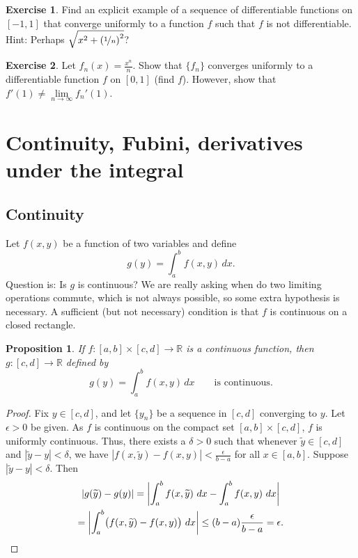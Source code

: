 \documentclass[12pt,openany]{book}
\newcommand{\bbabs}[1]{\biggl\lvert {#1} \biggr\rvert}
\newcommand{\abs}[1]{\left\lvert {#1} \right\rvert}
\newcommand{\R}{{\mathbb{R}}}
\theoremstyle{plain}
\newtheorem{prop}[thm]{Proposition}
\theoremstyle{remark}
\theoremstyle{definition}
\newenvironment{exbox}{%
    \def\FrameCommand{\vrule width 1pt \relax\hspace{10pt}}%
    \MakeFramed{\advance\hsize-\width\FrameRestore}%
}{%
    \endMakeFramed
}
\theoremstyle{exercise}
\newtheorem{exercise}{Exercise}[section]
\theoremstyle{example}
\begin{document}
\begin{exbox}
\begin{exercise}
Find an explicit example of a sequence of
differentiable functions on $[-1,1]$ that converge uniformly to
a function $f$ such that $f$ is not differentiable.
Hint:
Perhaps $\sqrt{x^2+{(\nicefrac{1}{n})}^2}$?
\end{exercise}

\begin{exercise}
Let $f_n(x) = \frac{x^n}{n}$.  Show that $\{ f_n \}$ converges uniformly to
a differentiable function $f$ on $[0,1]$ (find $f$).  However, show that
$f'(1) \not= \lim\limits_{n\to\infty} f_n'(1)$.
\end{exercise}
\end{exbox}


\section{Continuity, Fubini, derivatives under the integral}
\label{sec:contlimitsunderint}

\subsection{Continuity}

Let $f(x,y)$ be a function of two variables and define
\begin{equation*}
g(y) = \int_a^b f(x,y) \,dx .
\end{equation*}
Question is: Is $g$ is continuous?
We are really asking when do two limiting operations commute,
which is not always possible, so some extra hypothesis
is necessary.  A sufficient (but not
necessary) condition is that $f$ is continuous on a closed rectangle.

\begin{prop} \label{prop:integralcontcont}
If $f \colon [a,b] \times [c,d] \to \R$ is a continuous function,
then $g \colon [c,d] \to \R$ defined by
\begin{equation*}
g(y) = \int_a^b f(x,y) \,dx  \qquad \text{is continuous}.
\end{equation*}
\end{prop}

\begin{proof}
Fix $y \in [c,d]$, and let $\{ y_n \}$ be a sequence in $[c,d]$
converging to $y$.
Let $\epsilon > 0$ be given.
As $f$ is continuous on the compact set $[a,b] \times [c,d]$, $f$
is uniformly continuous.  
Thus, there exists a $\delta > 0$ such that
whenever $\widetilde{y} \in [c,d]$ and
$\abs{\widetilde{y}-y} < \delta$, we have
$\abs{f(x,\widetilde{y})-f(x,y)} < \frac{\epsilon}{b-a}$ for all $x \in [a,b]$.
Suppose $\abs{\widetilde{y}-y} < \delta$.  Then
\begin{multline*}
\abs{
g(\widetilde{y})-
g(y)
}
=
\bbabs{
\int_a^b 
f(x,\widetilde{y}) ~dx 
-
\int_a^b 
f(x,y) ~dx 
}
\\
=
\bbabs{
\int_a^b 
\bigl(
f(x,\widetilde{y}) - f(x,y)
\bigr)
~dx 
}
\leq
(b-a)
\frac{\epsilon}{b-a}
= \epsilon . \qedhere
\end{multline*}
\end{proof}
\end{document}

